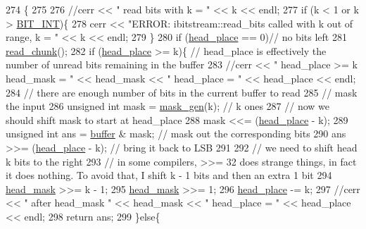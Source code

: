 \begin{DoxyCode}
274                                                 \{
275 
276   \textcolor{comment}{//cerr << " read bits with k = " << k << endl;}
277   \textcolor{keywordflow}{if} (k < 1 or k > \hyperlink{bitstream_8h_afcadf5aa65c5159bfb96c4d82ebc0a5d}{BIT\_INT})\{
278     cerr << \textcolor{stringliteral}{"ERROR: ibitstream::read\_bits called with k out of range, k = "} << k << endl;
279   \}
280   \textcolor{keywordflow}{if} (\hyperlink{classibitstream_a7b96359ac1534a5565e6e9b0cc53a0b3}{head\_place} == 0)\textcolor{comment}{// no bits left}
281     \hyperlink{classibitstream_ac62c26004436d83f337f4aeba0895e20}{read\_chunk}();
282   \textcolor{keywordflow}{if} (\hyperlink{classibitstream_a7b96359ac1534a5565e6e9b0cc53a0b3}{head\_place} >= k)\{ \textcolor{comment}{// head\_place is effectively the number of unread bits remaining in the
       buffer}
283     \textcolor{comment}{//cerr << " head\_place >= k head\_mask = " << head\_mask << " head\_place = " << head\_place << endl;}
284     \textcolor{comment}{// there are enough number of bits in the current buffer to read}
285     \textcolor{comment}{// mask the input}
286     \textcolor{keywordtype}{unsigned} \textcolor{keywordtype}{int} mask = \hyperlink{bitstream_8cpp_a6364b017a9400a38f7a994376bb3ebee}{mask\_gen}(k); \textcolor{comment}{// k ones}
287     \textcolor{comment}{// now we should shift mask to start at head\_place}
288     mask <<= (\hyperlink{classibitstream_a7b96359ac1534a5565e6e9b0cc53a0b3}{head\_place} - k);
289     \textcolor{keywordtype}{unsigned} \textcolor{keywordtype}{int} ans = \hyperlink{classibitstream_a73f0b24d3d4402369f1abbb43f7f70ef}{buffer} & mask; \textcolor{comment}{// mask out the corresponding bits}
290     ans >>= (\hyperlink{classibitstream_a7b96359ac1534a5565e6e9b0cc53a0b3}{head\_place} - k); \textcolor{comment}{// bring it back to LSB}
291 
292     \textcolor{comment}{// we need to shift head k bits to the right}
293     \textcolor{comment}{// in some compilers, >>= 32 does strange things, in fact it does nothing. To avoid that, I shift k - 1
       bits and then an extra 1 bit}
294     \hyperlink{classibitstream_a48cd41991b6c29ea5120b53873a72a70}{head\_mask} >>= k - 1;
295     \hyperlink{classibitstream_a48cd41991b6c29ea5120b53873a72a70}{head\_mask} >>= 1;
296     \hyperlink{classibitstream_a7b96359ac1534a5565e6e9b0cc53a0b3}{head\_place} -= k;
297     \textcolor{comment}{//cerr << " after head\_mask " << head\_mask << " head\_place = " << head\_place << endl;}
298     \textcolor{keywordflow}{return} ans;
299   \}\textcolor{keywordflow}{else}\{

\end{DoxyCode}
